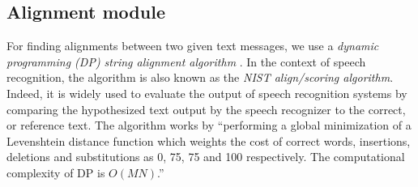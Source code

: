 


\subsection{Alignment module}
\label{secalignmentmodule}



For finding alignments between two given text messages, we use 
a \textit{dynamic programming (DP) string alignment algorithm} \cite{sankoff:1983}. 
In the context of speech recognition, the algorithm is also known as the \textit{NIST align/scoring algorithm}. Indeed, it is widely used to evaluate the output of speech recognition systems by comparing the hypothesized text %
output by the speech recognizer to the correct, or reference %
text. 
%
The %
algorithm works by ``performing a global minimization of a Levenshtein distance function which weights the cost of correct words, insertions, deletions and substitutions as 0, 75, 75 and 100 respectively.
%
The computational complexity of DP is $O(MN)$.''




